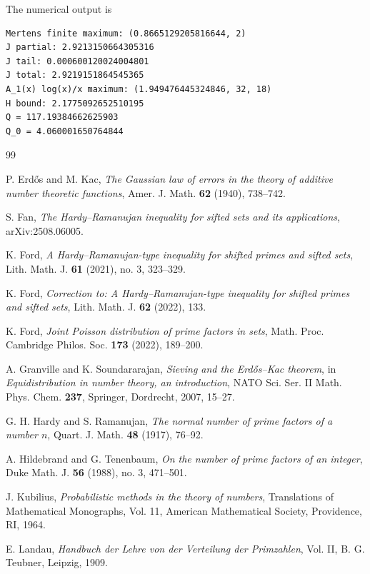 \documentclass[12pt,a4paper,reqno]{amsart}
\theoremstyle{plain}
\numberwithin{sblmm}{thrm}
\numberwithin{equation}{section}
\begin{document}
The numerical output is
\begin{verbatim}
Mertens finite maximum: (0.8665129205816644, 2)
J partial: 2.9213150664305316
J tail: 0.000600120024004801
J total: 2.9219151864545365
A_1(x) log(x)/x maximum: (1.949476445324846, 32, 18)
H bound: 2.1775092652510195
Q = 117.19384662625903
Q_0 = 4.060001650764844
\end{verbatim}

\begin{thebibliography}{99}

P. Erd\H{o}s and M. Kac,
\emph{The Gaussian law of errors in the theory of additive number theoretic functions},
Amer. J. Math. \textbf{62} (1940), 738--742.

S. Fan,
\emph{The Hardy--Ramanujan inequality for sifted sets and its applications},
arXiv:2508.06005.

K. Ford,
\emph{A Hardy--Ramanujan-type inequality for shifted primes and sifted sets},
Lith. Math. J. \textbf{61} (2021), no. 3, 323--329.

K. Ford,
\emph{Correction to: A Hardy--Ramanujan-type inequality for shifted primes and sifted sets},
Lith. Math. J. \textbf{62} (2022), 133.

K. Ford,
\emph{Joint Poisson distribution of prime factors in sets},
Math. Proc. Cambridge Philos. Soc. \textbf{173} (2022), 189--200.

A. Granville and K. Soundararajan,
\emph{Sieving and the Erd\H{o}s--Kac theorem},
in \emph{Equidistribution in number theory, an introduction}, NATO Sci. Ser. II Math. Phys. Chem. \textbf{237}, Springer, Dordrecht, 2007, 15--27.

G. H. Hardy and S. Ramanujan,
\emph{The normal number of prime factors of a number $n$},
Quart. J. Math. \textbf{48} (1917), 76--92.

A. Hildebrand and G. Tenenbaum,
\emph{On the number of prime factors of an integer},
Duke Math. J. \textbf{56} (1988), no. 3, 471--501.

J. Kubilius,
\emph{Probabilistic methods in the theory of numbers},
Translations of Mathematical Monographs, Vol. 11, American Mathematical Society, Providence, RI, 1964.

E. Landau,
\emph{Handbuch der Lehre von der Verteilung der Primzahlen}, Vol. II,
B. G. Teubner, Leipzig, 1909.


\end{thebibliography}
\end{document}
